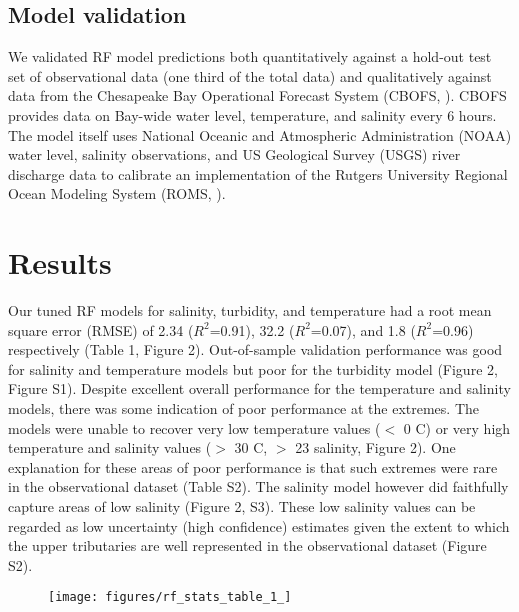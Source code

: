 \documentclass{article}
\begin{document}
\subsection{Model validation}

We validated RF model predictions both quantitatively against a hold-out test set of observational data (one third of the total data) and qualitatively against data from the Chesapeake Bay Operational Forecast System (CBOFS, \cite{lanerolle2011second}). CBOFS provides data on Bay-wide water level, temperature, and salinity every 6 hours. The model itself uses National Oceanic and Atmospheric Administration (NOAA) water level, salinity observations, and US Geological Survey (USGS) river discharge data to calibrate an implementation of the Rutgers University Regional Ocean Modeling System (ROMS, \cite{shchepetkinRegionalOceanicModeling2005}).


\section{Results}

Our tuned RF models for salinity, turbidity, and temperature had a root mean square error (RMSE) of 2.34 ($R^2$=0.91), 32.2 ($R^2$=0.07), and 1.8 ($R^2$=0.96) respectively (Table 1, Figure 2). Out-of-sample validation performance was good for salinity and temperature models but poor for the turbidity model (Figure 2, Figure S1). Despite excellent overall performance for the temperature and salinity models, there was some indication of poor performance at the extremes. The models were unable to recover very low temperature values ($<$ 0 C) or very high temperature and salinity values ($>$ 30 C, $>$ 23 salinity, Figure 2). One explanation for these areas of poor performance is that such extremes were rare in the observational dataset (Table S2). The salinity model however did faithfully capture areas of low salinity (Figure 2, S3). These low salinity values can be regarded as low uncertainty (high confidence) estimates given the extent to which the upper tributaries are well represented in the observational dataset (Figure S2).

\begin{figure}[ht!]
    \begin{center}
          \texttt{[image: figures/rf\_stats\_table\_1\_]}          
    \end{center}    
\end{figure}
\end{document}
